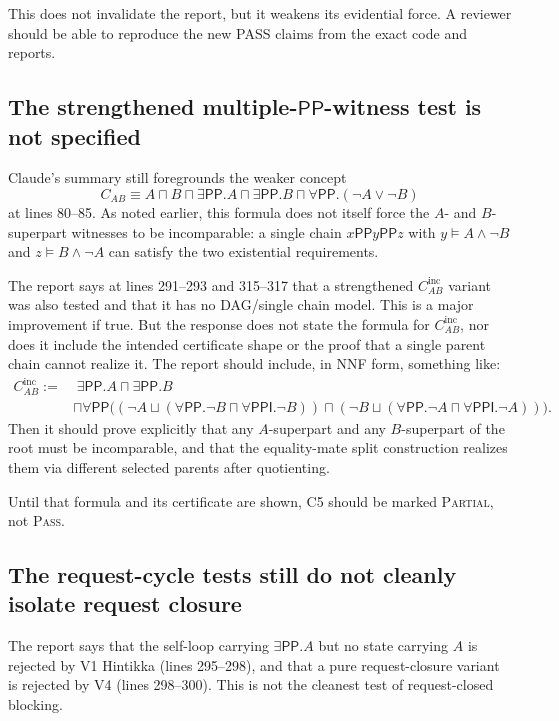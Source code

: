 \documentclass[11pt]{article}
\newcommand{\PP}{\mathsf{PP}}
\newcommand{\PPI}{\mathsf{PPI}}
\newcommand{\PASS}{\textsc{Pass}}
\newcommand{\PARTIAL}{\textsc{Partial}}
\begin{document}
This does not invalidate the report, but it weakens its evidential force.  A
reviewer should be able to reproduce the new PASS claims from the exact code and
reports.

\subsection{The strengthened multiple-\(\PP\)-witness test is not specified}

Claude's summary still foregrounds the weaker concept
\[
C_{AB} \equiv
A \sqcap B \sqcap \exists\PP.A \sqcap \exists\PP.B
\sqcap \forall\PP.(\neg A \vee \neg B)
\]
at lines 80--85.  As noted earlier, this formula does not itself force the
\(A\)- and \(B\)-superpart witnesses to be incomparable: a single chain
\(x\PP y\PP z\) with \(y\models A\wedge\neg B\) and
\(z\models B\wedge\neg A\) can satisfy the two existential requirements.

The report says at lines 291--293 and 315--317 that a strengthened
\(C_{AB}^{\mathrm{inc}}\) variant was also tested and that it has no DAG/single
chain model.  This is a major improvement if true.  But the response does not
state the formula for \(C_{AB}^{\mathrm{inc}}\), nor does it include the intended
certificate shape or the proof that a single parent chain cannot realize it.
The report should include, in NNF form, something like:
\[
\begin{aligned}
C_{AB}^{\mathrm{inc}} :=
&\; \exists\PP.A \sqcap \exists\PP.B \\
&\sqcap \forall\PP\bigl(
  (\neg A \sqcup (\forall\PP.\neg B \sqcap \forall\PPI.\neg B))
  \sqcap
  (\neg B \sqcup (\forall\PP.\neg A \sqcap \forall\PPI.\neg A))
\bigr).
\end{aligned}
\]
Then it should prove explicitly that any \(A\)-superpart and any
\(B\)-superpart of the root must be incomparable, and that the equality-mate
split construction realizes them via different selected parents after quotienting.

Until that formula and its certificate are shown, C5 should be marked
\PARTIAL{}, not \PASS{}.

\subsection{The request-cycle tests still do not cleanly isolate request closure}

The report says that the self-loop carrying \(\exists\PP.A\) but no state
carrying \(A\) is rejected by V1 Hintikka (lines 295--298), and that a pure
request-closure variant is rejected by V4 (lines 298--300).  This is not the
cleanest test of request-closed blocking.
\end{document}
